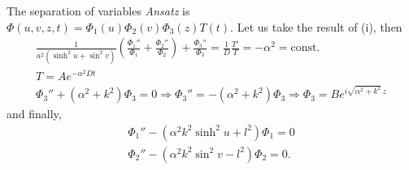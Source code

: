 {The separation of variables {\it Ansatz} is  $\Phi(u,v,z,t)=\Phi_1(u)\Phi_2(v)\Phi_3(z)T(t)$.
Let us take the result of (i), then
\begin{equation}
\begin{split}
  \frac{1}{a^2(\sinh^2u+\sin^2v)}
  \left(
    \frac{\Phi_1''}{\Phi_1}+
    \frac{\Phi_2''}{\Phi_2}
  \right)+\frac{\Phi_3''}{\Phi_3}=\frac{1}{D}\frac{T'}{T}=
    -\alpha^2=\mbox{const.}
\\
  T=Ae^{-\alpha^2Dt}
\\
  \Phi_3''+(\alpha^2+k^2)\Phi_3=0
  \Longrightarrow
  \Phi_3''=-(\alpha^2+k^2)\Phi_3
  \Longrightarrow
  \Phi_3=Be^{i\sqrt{\alpha^2+k^2} \, z}
\end{split}
\end{equation}
and finally,
\begin{equation}
  \begin{split}
    \Phi_1''   -   (\alpha^2k^2\sinh^2u+l^2)\Phi_1   =   0 \\
    \Phi_2''   -   (\alpha^2k^2\sin^2v-l^2)\Phi_2   =   0
.
  \end{split}
\end{equation}


\eexample
}



\begin{center}
{\color{olive}   \Huge
\leafleft
}
\end{center}
